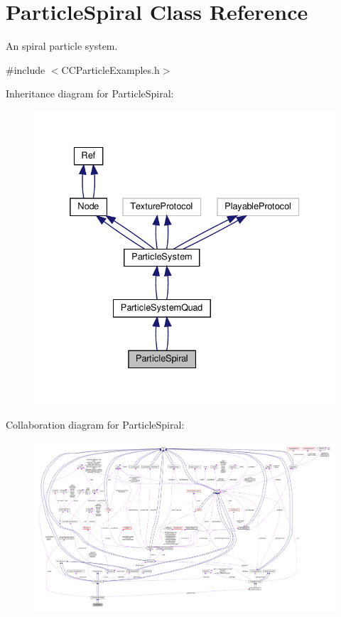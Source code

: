 \hypertarget{classParticleSpiral}{}\section{Particle\+Spiral Class Reference}
\label{classParticleSpiral}


An spiral particle system.  




{\ttfamily \#include $<$C\+C\+Particle\+Examples.\+h$>$}



Inheritance diagram for Particle\+Spiral\+:
\nopagebreak
\begin{figure}[H]
\begin{center}
\leavevmode
\includegraphics[width=332pt]{classParticleSpiral__inherit__graph}
\end{center}
\end{figure}


Collaboration diagram for Particle\+Spiral\+:
\nopagebreak
\begin{figure}[H]
\begin{center}
\leavevmode
\includegraphics[width=350pt]{classParticleSpiral__coll__graph}
\end{center}
\end{figure}
